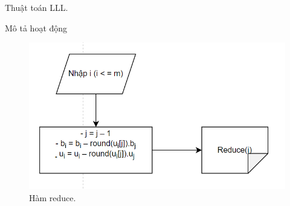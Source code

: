 \documentclass{beamer}
\numberwithin{equation}{section}
\begin{document}
\begin{frame}{Thuật toán LLL.}

\end{frame}
\begin{frame}{Mô tả hoạt động}

\begin{figure}[h]
\centering
\includegraphics[scale = 0.6]{pictures/a.12.png}
\caption{Hàm reduce.}
\end{figure}

\end{frame}
\end{document}
